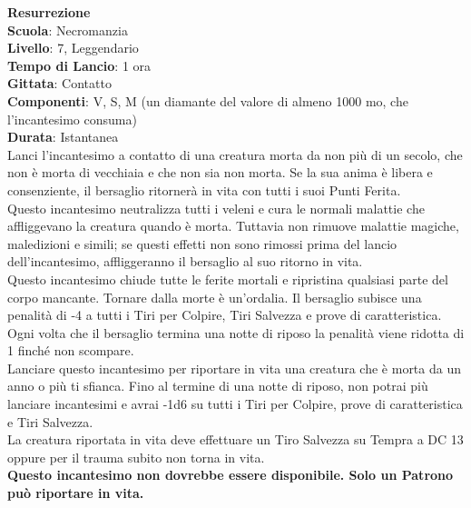 \begin{multicols}{2}
\medskip\textbf{Resurrezione}\\
\textbf{Scuola}: Necromanzia\\
\textbf{Livello}: 7, Leggendario\\
\textbf{Tempo di Lancio}: 1 ora\\
\textbf{Gittata}: Contatto\\
\textbf{Componenti}: V, S, M (un diamante del valore di almeno 1000 mo, che l'incantesimo consuma)\\
\textbf{Durata}: Istantanea\\
Lanci l'incantesimo a contatto di una creatura morta da non più di un secolo, che non è morta di vecchiaia e che non sia non morta. Se la sua anima è libera e consenziente, il bersaglio ritornerà in vita con tutti i suoi Punti Ferita.\\
Questo incantesimo neutralizza tutti i veleni e cura le normali malattie che affliggevano la creatura quando è morta. Tuttavia non rimuove malattie magiche, maledizioni e simili; se questi effetti non sono rimossi prima del lancio dell'incantesimo, affliggeranno il bersaglio al suo ritorno in vita.\\
Questo incantesimo chiude tutte le ferite mortali e ripristina qualsiasi parte del corpo mancante. Tornare dalla morte è un'ordalia. Il bersaglio subisce una penalità di -4 a tutti i Tiri per Colpire, Tiri Salvezza e prove di caratteristica. Ogni volta che il bersaglio termina una notte di riposo la penalità viene ridotta di 1 finché non scompare.\\
Lanciare questo incantesimo per riportare in vita una creatura che è morta da un anno o più ti sfianca. Fino al termine di una notte di riposo, non potrai più lanciare incantesimi e avrai -1d6 su tutti i Tiri per Colpire, prove di caratteristica e Tiri Salvezza.\\
La creatura riportata in vita deve effettuare un Tiro Salvezza su Tempra a DC 13 oppure per il trauma subito non torna in vita.\\
\textbf{Questo incantesimo non dovrebbe essere disponibile. Solo un Patrono può riportare in vita.}


\end{multicols}
